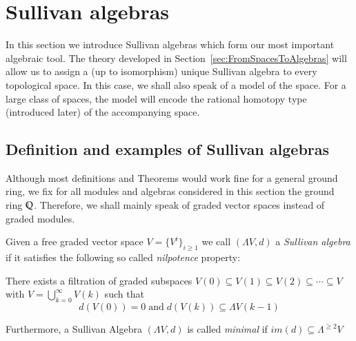 \section{Sullivan algebras}

In this section we introduce Sullivan algebras which form our most important algebraic tool. The theory
developed in  Section~\ref{sec:FromSpacesToAlgebras} will allow us to assign a (up to isomorphism) unique Sullivan algebra
to every topological space. In this case, we shall also speak of a model of the space. For a large class of spaces,
the model will encode the rational 
homotopy type (introduced later) of the accompanying space.
% 


\subsection{Definition and examples of Sullivan algebras}
Although most definitions and Theorems would work fine for a general ground ring, we fix for 
all modules and algebras considered in this section the ground ring $\mathbb{Q}$. Therefore, we shall mainly speak of 
graded vector spaces instead of graded modules.

\begin{Definition}
 Given a free graded vector space $V = {\lbrace {V^i}\rbrace}_{ i \geq 1} $ we call $(\Lambda V, d)$ a \emph{Sullivan algebra} 
 if it satisfies the following so called \emph{nilpotence} property:
 
  There exists a filtration of graded subspaces $V(0) \subseteq V(1) \subseteq V(2) \subseteq \cdots \subseteq V$
  with $ V = \bigcup_{k = 0}^{\infty} V(k)$ such that 
  $$ d(V(0)) = 0 \; \text{and} \; d( V(k)) \subseteq  \Lambda V(k-1) $$
  
 Furthermore, a Sullivan Algebra $(\Lambda V,d)$ is called \emph{minimal} if $im(d) \subseteq \Lambda^{\geq 2} V$
\end{Definition}

